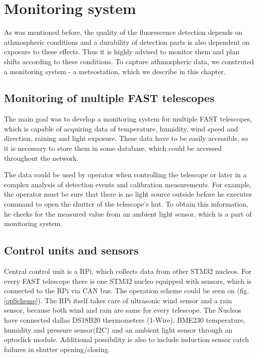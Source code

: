
\chapter{Monitoring system}
As was mentioned before, the quality of the fluorescence detection depends on athmospheric conditions and a durability of detection parts is also dependent on exposure to these effects. Thus it is highly advised to monitor them and plan shifts according to these conditions. To capture athmospheric data, we construted a monitoring system - a meteostation, which we describe in this chapter.
\section{Monitoring of multiple FAST telescopes}
The main goal was to develop a monitoring system for multiple FAST telescopes, which is capable of acquiring data of temperature, humidity, wind speed and direction, raining and light exposure. These data have to be easily accessible, so it is necessary to store them in some database, which could be accessed throughout the network. 
\par
The data could be used by operator when controlling the telescope or later in a complex analysis of detection events and calibration measurements. For example, the operator must be sure that there is no light source outside before he executes command to open the shutter of the telescope's hut. To obtain this information, he checks for the measured value from an ambient light sensor, which is a part of monitoring system.
\par

\section{Control units and sensors}
Central control unit is a RPi, which collects data from other STM32 nucleos. For every FAST telescope there is one STM32 nucleo equipped with sensors, which is connected to the RPi via CAN bus. The operation scheme could be seen on (fig. \ref{opScheme}). The RPi itself takes care of ultrasonic wind sensor and a rain sensor, because both wind and rain are same for every telescope. The Nucleos have connected dallas DS18B20 thermometers (1-Wire), BME230 temperature, humidity and pressure sensor(I2C) and an ambient light sensor through an optoclick module. Additional possibility is also to include induction sensor catch failures in shutter opening/closing.


